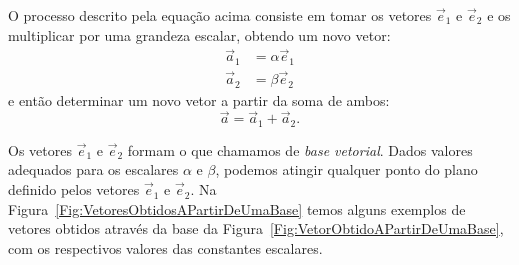 \noindent{}O processo descrito pela equação acima consiste em tomar os vetores $\vec{e}_1$ e $\vec{e}_2$ e os multiplicar por uma grandeza escalar, obtendo um novo vetor:
\begin{align}
    \vec{a}_1 &= \alpha\vec{e}_1 \\
    \vec{a}_2 &= \beta\vec{e}_2
\end{align}
%
e então determinar um novo vetor a partir da soma de ambos:
\begin{equation}
    \vec{a} = \vec{a}_1 + \vec{a}_2.
\end{equation}

Os vetores $\vec{e}_1$ e $\vec{e}_2$ formam o que chamamos de \emph{base vetorial}. Dados valores adequados para os escalares $\alpha$ e $\beta$, podemos atingir qualquer ponto do plano definido pelos vetores $\vec{e}_1$ e $\vec{e}_2$. Na Figura~\ref{Fig:VetoresObtidosAPartirDeUmaBase} temos alguns exemplos de vetores obtidos através da base da Figura~\ref{Fig:VetorObtidoAPartirDeUmaBase}, com os respectivos valores das constantes escalares.


